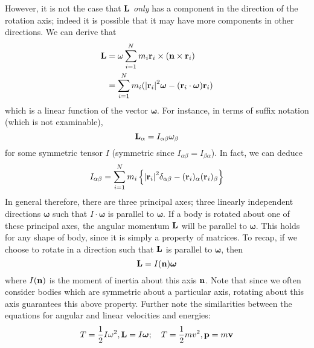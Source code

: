 However, it is not the case that \(\vb L\) \textit{only} has a component in the direction of the rotation axis; indeed it is possible that it may have more components in other directions.
We can derive that
\begin{align*}
	\vb L & = \omega \sum_{i=1}^N m_i \vb r_i \times (\vb n \times \vb r_i)                     \\
	      & = \sum_{i=1}^N m_i (\abs{\vb r_i}^2 \bm\omega - (\vb r_i \cdot \bm \omega) \vb r_i)
\end{align*}
which is a linear function of the vector \(\bm\omega\).
For instance, in terms of suffix notation (which is not examinable),
\[
	\vb L_\alpha = I_{\alpha\beta} \omega_\beta
\]
for some symmetric tensor \(I\) (symmetric since \(I_{\alpha\beta} = I_{\beta\alpha}\)).
In fact, we can deduce
\[
	I_{\alpha\beta} = \sum_{i=1}^N m_i \left\{ \abs{\vb r_i}^2 \delta_{\alpha\beta} - (\vb r_i)_\alpha (\vb r_i)_\beta \right\}
\]
In general therefore, there are three principal axes; three linearly independent directions \(\bm \omega\) such that \(I \cdot \bm \omega\) is parallel to \(\bm \omega\).
If a body is rotated about one of these principal axes, the angular momentum \(\vb L\) will be parallel to \(\bm\omega\).
This holds for any shape of body, since it is simply a property of matrices.
To recap, if we choose to rotate in a direction such that \(\vb L\) is parallel to \(\bm \omega\), then
\[
	\vb L = I(\vb n) \bm \omega
\]
where \(I(\vb n)\) is the moment of inertia about this axis \(\vb n\).
Note that since we often consider bodies which are symmetric about a particular axis, rotating about this axis guarantees this above property.
Further note the similarities between the equations for angular and linear velocities and energies:
\[
	T = \frac{1}{2}I\omega^2, \vb L = I\bm\omega;\quad T = \frac{1}{2}mv^2, \vb p = m\vb v
\]

